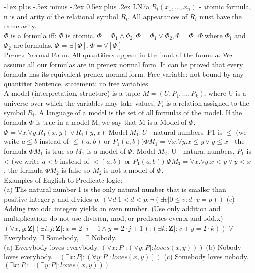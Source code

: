 \documentclass[letterpaper, 8pt]{extarticle}
\makeatletter
\renewcommand{\section}{\@startsection{section}{1}{0mm}%
                                {-1ex plus -.5ex minus -.2ex}%
                                {0.5ex plus .2ex}%
                                {\normalfont\normalsize\bfseries}}
\makeatother
\begin{document}
\begin{multicols*}{3}
    \section{LN7a}
    $R_i(x_1,...,x_n)$ - atomic formula, n is and arity of the relational symbol $R_i$. All appearances of $R_i$ must have the same arity.\\
    $\Phi$ is a formula iff: $\Phi$ is atomic. $\Phi = \Phi _1 \land \Phi _2, \Phi = \Phi _1 \lor \Phi _2, \Phi = \Phi \neg \Phi$ where $\Phi _1$ and $\Phi _2$ are formulas. $\Phi$ = $\exists [\Phi], \Phi = \forall [\Phi]$\\
    Prenex Normal Form: All quantifiers appear in the front of
    the formula. We assume all our formulas are in prenex normal form.
    It can be proved that every formula has its equivalent prenex normal form. Free variable: not bound by any quantifier Sentence, statement: no free variables.\\
    A model (interpretation, structure) is a tuple $M = (U,P_1,...,P_k )$,
    where U is a universe over which the variables may take values, $P_i$ is a relation assigned to the symbol $R_i$. A language of a model is the set of all formulas of the model. If the formula $\Phi$ is true in a model M, we say that M is a Model of $\Phi$.\\
    $\Phi = \forall x.\forall y. R_1(x, y) \lor R_1(y, x)$
    Model $M_1: U$ - natural numbers, P1 is $\leq$ (we write $a \leq b$ instead of $\leq (a, b)$ or $P_1(a, b)) \Phi M_1 = \forall x. \forall y. x \leq y \lor y \leq x$ - the formula $\Phi M_1$ is true so $M_1$ is a model of $\Phi$. Model $M_2$: U - natural numbers, $P_1$ is < (we write $a < b$ instead of $< (a, b)$ or $ P_1(a, b))$ $\Phi M_2 = \forall x.\forall y. x < y \lor y < x$, the formula $\Phi M_2$ is false so $M_2$ is not a model of $\Phi$.\\
    Examples of English to Predicate logic:\\
    (a) The natural number 1  is the only natural number that is smaller than positive integer $p$ and divides $p$. $(\forall d | 1 < d < p : \neg (\exists v | 0 \leq v : d \cdot v = p))$
    (c) Adding two odd integers yields an even number. (Use only addition and multiplication; do not use division, mod, or predicates even.x and odd.x) $(\forall x, y : \mathbf{Z} | (\exists i, j: \mathbf{Z} |: x = 2 \cdot i + 1 \land y = 2 \cdot j +1) : (\exists k: \mathbf{Z}|: x + y = 2 \cdot k))$
    $\forall$ Everybody, $\exists$ Somebody, $\neg \exists$ Nobody.\\
    (a) Everybody loves everybody. $(\forall x :P|:(\forall y: P|: loves(x,y)))$ (b) Nobody loves everybody. $\neg (\exists x: P|: (\forall y: P|: loves(x,y)))$ (c) Somebody loves nobody. $(\exists x : P|: \neg (\exists y :P|: loves(x,y)))$
\end{multicols*}
\end{document}
